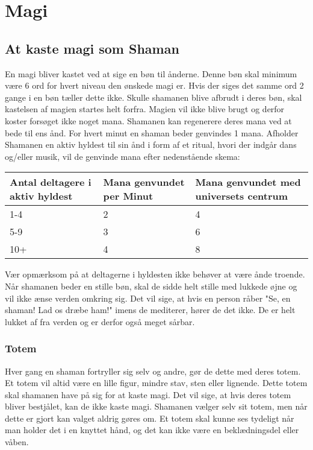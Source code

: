 \chapter*{Magi}
\section*{At kaste magi som Shaman}
En magi bliver kastet ved at sige en bøn til ånderne. Denne bøn skal minimum være 6 ord for hvert niveau den ønskede magi er. Hvis der siges det samme ord 2 gange i en bøn tæller dette ikke. Skulle shamanen blive afbrudt i deres bøn, skal kastelsen af magien startes helt forfra. Magien vil ikke blive brugt og derfor koster forsøget ikke noget mana. Shamanen kan regenerere deres mana ved at bede til ens ånd. For hvert minut en shaman beder genvindes 1 mana. Afholder Shamanen en aktiv hyldest til sin ånd i form af et ritual, hvori der indgår dans og/eller musik, vil de genvinde mana efter nedenstående skema:

\begin{table}[H]
    \centering
    \begin{tabular}{|p{}|p{}|p{}|}
    \rowcolor{cerulean!80}\hline
        Antal deltagere i aktiv hyldest & Mana genvundet per Minut & Mana genvundet med universets centrum \\\hline
        1-4&2&4\\\hline
        5-9&3&6\\\hline
        10+&4&8\\\hline
    \end{tabular}
\end{table}
Vær opmærksom på at deltagerne i hyldesten ikke behøver at være ånde troende. 
Når shamanen beder en stille bøn, skal de sidde helt stille med lukkede øjne og vil ikke ænse verden omkring sig. Det vil sige, at hvis en person råber "Se, en shaman! Lad os dræbe ham!" imens de mediterer, hører de det ikke. De er helt lukket af fra verden og er derfor også meget sårbar.

\subsection*{Totem}
Hver gang en shaman fortryller sig selv og andre, gør de dette med deres totem. Et totem vil altid være en lille figur, mindre stav, sten eller lignende. Dette totem skal shamanen have på sig for at kaste magi. Det vil sige, at hvis deres totem bliver bestjålet, kan de ikke kaste magi. Shamanen vælger selv sit totem, men når dette er gjort kan valget aldrig gøres om. Et totem skal kunne ses tydeligt når man holder det i en knyttet hånd, og det kan ikke være en beklædningsdel eller våben.\\

